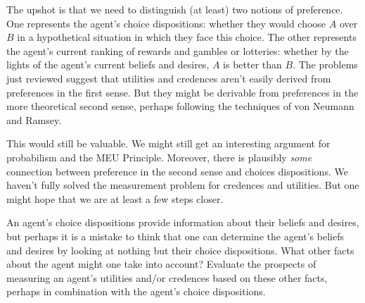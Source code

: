 The upshot is that we need to distinguish (at least) two notions of preference.
One represents the agent's choice dispositions: whether they would choose $A$
over $B$ in a hypothetical situation in which they face this choice. The other
represents the agent's current ranking of rewards and gambles or lotteries:
whether by the lights of the agent's current beliefs and desires, $A$ is better
than $B$. The problems just reviewed suggest that utilities and credences aren't
easily derived from preferences in the first sense. But they might be derivable
from preferences in the more theoretical second sense, perhaps following the
techniques of von Neumann and Ramsey.

This would still be valuable. We might still get an interesting argument for
probabilism and the MEU Principle. Moreover, there is plausibly \emph{some}
connection between preference in the second sense and choices dispositions. We
haven't fully solved the measurement problem for credences and utilities. But
one might hope that we are at least a few steps closer.



\begin{essay}
  An agent's choice dispositions provide information about their beliefs and
  desires, but perhaps it is a mistake to think that one can determine the
  agent's beliefs and desires by looking at nothing but their choice
  dispositions. What other facts about the agent might one take into account?
  Evaluate the prospects of measuring an agent's utilities and/or credences
  based on these other facts, perhaps in combination with the agent's choice
  dispositions.
\end{essay}

